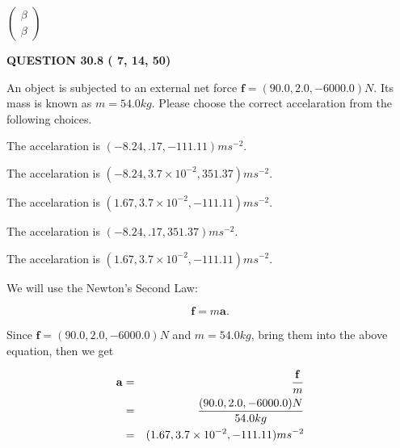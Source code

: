 \documentclass[12pt]{article}
\begin{document}
   
 $  \left( \begin{array}
 {
 c
 }
 \beta \\ 
 \beta
 \end{array} \right) $ 
  
\vspace{0.2in}
  
{\textbf{\Large{QUESTION
30.8 
 (          7,         14,         50)
}}}
  
  
 
An object is subjected to an external net force $\mathbf{f}=
(90.0 , 2.0 , -6000.0) N$.
Its mass is known as $m= %
54.0 kg$.
Please choose the correct accelaration from the following choices.
 
 
  The accelaration is $  %
(
-8.24,
.17,
-111.11)
ms^{-2} $.
 
 
  The accelaration is $  %
(
-8.24,
3.7 \times 10^{-2},
351.37)
ms^{-2} $.
 
 
  The accelaration is $  %
(
1.67,
3.7 \times 10^{-2},
-111.11)
ms^{-2} $.
 
 
  The accelaration is $  %
(
-8.24,
.17,
351.37)
ms^{-2} $.
 
 
\noindent{}
 
 
  The accelaration is $  %
(
1.67,
3.7 \times 10^{-2},
-111.11)
ms^{-2} $.
 
 
\noindent{}
 
 
 
 
 
\noindent{}
 
 

We will use the Newton's Second Law:
 
\[
\mathbf{f}=m\mathbf{a}.
\]
 
Since $\mathbf{f}= %
(90.0 , 2.0 , -6000.0) N$
and $m= %
54.0kg$, bring them into the above equation, then we get
 
\begin{eqnarray*}
\mathbf{a}&=&\frac{\mathbf{f}}m  \\
&=&\frac{ %
(90.0 , 2.0 , -6000.0) N}{ %
54.0kg}  \\
&=& %
(1.67 , 3.7 \times 10^{-2} , -111.11) ms^{-2}
\end{eqnarray*}
 
\end{document}
